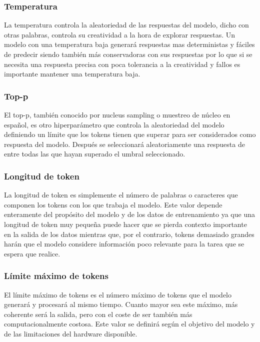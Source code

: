 \subsubsection{Temperatura}

La temperatura controla la aleatoriedad de las respuestas del modelo, dicho con otras palabras, controla su creatividad a la hora de explorar respuestas. Un modelo con una temperatura baja generará respuestas mas deterministas y fáciles de predecir siendo también más conservadoras con sus respuestas por lo que si se necesita una respuesta precisa con poca tolerancia a la creatividad y fallos es importante mantener una temperatura baja.

\subsubsection{Top-p}

El top-p, también conocido por nucleus sampling o muestreo de núcleo en español, es otro hiperparámetro que controla la aleatoriedad del modelo definiendo un límite que los tokens tienen que superar para ser considerados como respuesta del modelo. Después se seleccionará aleatoriamente una respuesta de entre todas las que hayan superado el umbral seleccionado. 

\subsubsection{Longitud de token}

La longitud de token es simplemente el número de palabras o caracteres que componen los tokens con los que trabaja el modelo. Este valor depende enteramente del propósito del modelo y de los datos de entrenamiento ya que una longitud de token muy pequeña puede hacer que se pierda contexto importante en la salida de los datos mientras que, por el contrario, tokens demasiado grandes harán que el modelo considere información poco relevante para la tarea que se espera que realice.

\subsubsection{Límite máximo de tokens}

El límite máximo de tokens es el número máximo de tokens que el modelo generará y procesará al mismo tiempo. Cuanto mayor sea este máximo, más coherente será la salida, pero con el coste de ser también más computacionalmente costosa. Este valor se definirá según el objetivo del modelo y de las limitaciones del hardware disponible.

